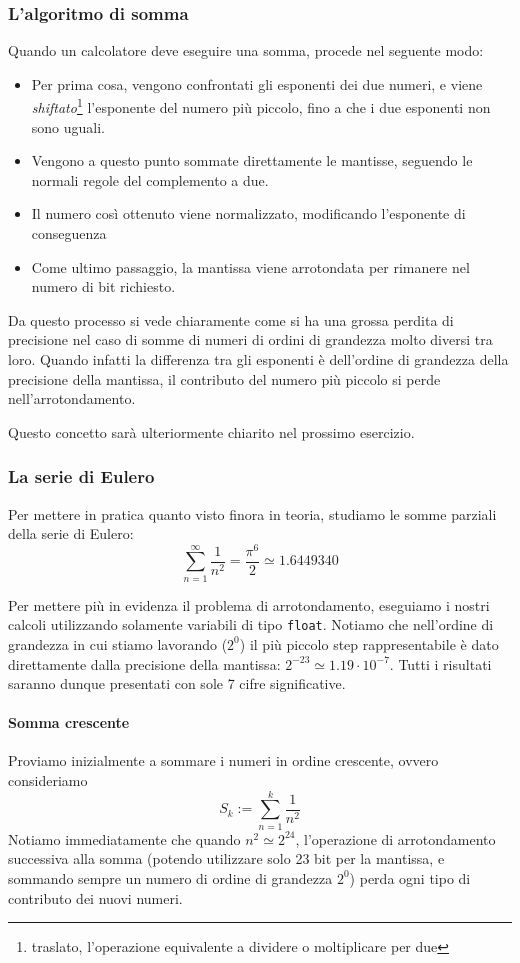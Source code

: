 \documentclass[a4paper,10pt]{article}
\begin{document}
\subsubsection{L'algoritmo di somma}
Quando un calcolatore deve eseguire una somma, procede nel seguente modo:
\begin{itemize}
\item Per prima cosa, vengono confrontati gli esponenti dei due numeri, e viene \emph{shiftato}\footnote{traslato, l'operazione equivalente a dividere o moltiplicare per due} l'esponente del numero più piccolo, fino a che i due esponenti non sono uguali.
\item Vengono a questo punto sommate direttamente le mantisse, seguendo le normali regole del complemento a due.
\item Il numero così ottenuto viene normalizzato, modificando l'esponente di conseguenza
\item Come ultimo passaggio, la mantissa viene arrotondata per rimanere nel numero di bit richiesto. 
\end{itemize}

Da questo processo si vede chiaramente come si ha una grossa perdita di precisione nel caso di somme di numeri di ordini di grandezza molto diversi tra loro. Quando infatti la differenza tra gli esponenti è dell'ordine di grandezza della precisione della mantissa, il contributo del numero più piccolo si perde nell'arrotondamento.

Questo concetto sarà ulteriormente chiarito nel prossimo esercizio.

\subsubsection{La serie di Eulero}
Per mettere in pratica quanto visto finora in teoria, studiamo le somme parziali della serie di Eulero:
$$\sum_{n=1}^\infty \frac{1}{n^2} = \frac{\pi^6}{2} \simeq 1.6449340 $$

Per mettere più in evidenza il problema di arrotondamento, eseguiamo i nostri calcoli utilizzando solamente variabili di tipo \texttt{float}. Notiamo che nell'ordine di grandezza in cui stiamo lavorando ($2^0$) il più piccolo step rappresentabile è dato direttamente dalla precisione della mantissa: $2^{-23}\simeq 1.19\cdot10^{-7}$. Tutti i risultati saranno dunque presentati con sole 7 cifre significative.

\paragraph{Somma crescente}
Proviamo inizialmente a sommare i numeri in ordine crescente, ovvero consideriamo
$$S_k := \sum_{n=1}^k \frac{1}{n^2}$$
Notiamo immediatamente che quando $n^2\simeq2^{24}$, l'operazione di arrotondamento successiva alla somma (potendo utilizzare solo 23 bit per la mantissa, e sommando sempre un numero di ordine di grandezza $2^0$) perda ogni tipo di contributo dei nuovi numeri.
\end{document}
